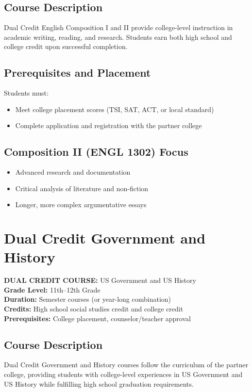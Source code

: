 \documentclass[12pt,oneside]{book}
\begin{document}
\section{Course Description}
Dual Credit English Composition I and II provide college-level instruction in academic writing,
reading, and research. Students earn both high school and college credit upon successful completion.

\section{Prerequisites and Placement}
Students must:
\begin{itemize}[leftmargin=2em]
    \item Meet college placement scores (TSI, SAT, ACT, or local standard)
    \item Complete application and registration with the partner college
\end{itemize}

\section{Composition II (ENGL 1302) Focus}
\begin{itemize}[leftmargin=2em]
    \item Advanced research and documentation
    \item Critical analysis of literature and non-fiction
    \item Longer, more complex argumentative essays
\end{itemize}

\chapter{Dual Credit Government and History}

\noindent\textbf{DUAL CREDIT COURSE:} US Government and US History\\
\textbf{Grade Level:} 11th--12th Grade\\
\textbf{Duration:} Semester courses (or year-long combination)\\
\textbf{Credits:} High school social studies credit and college credit\\
\textbf{Prerequisites:} College placement, counselor/teacher approval

\section{Course Description}
Dual Credit Government and History courses follow the curriculum of the partner college,
providing students with college-level experiences in US Government and US History while
fulfilling high school graduation requirements.
\end{document}
